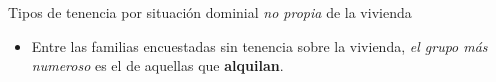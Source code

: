 \documentclass[aspectratio=169]{beamer}
\begin{document}
    \begin{frame}{Tipos de tenencia por situación dominial \textit{no propia} de la vivienda}
        \begin{minipage}{.65\linewidth}
            \begin{overlayarea}{\linewidth}{.75\textheight}
            \end{overlayarea}
        \end{minipage}
        \begin{minipage}{.34\linewidth}
            \setlength{\leftmargini}{12pt}
            \begin{itemize}
                \item<2-> Entre las familias encuestadas sin tenencia sobre la vivienda, \textit{el grupo más numeroso} es el de aquellas que \textbf{\textcolor{gold!90!black}{alquilan}}.
            \end{itemize}
        \end{minipage}
    \end{frame}
\end{document}
